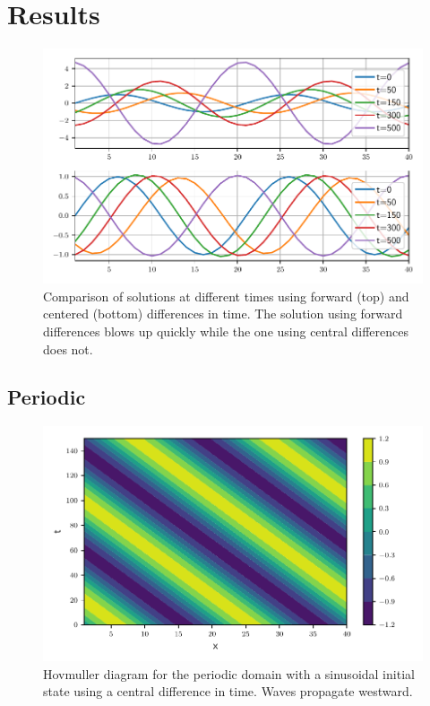 \section{Results}

\begin{figure}[htp]
  \centering
  \includegraphics[width=\textwidth]{../figures/compare_dt_1.pdf}
  \caption{Comparison of solutions at different times using forward (top) and
  centered (bottom) differences in time. The solution using forward differences
  blows up quickly while the one using central differences does not.}
  \label{fig:compare}
\end{figure}


\subsection{Periodic}



\begin{figure}[htp]
  \centering
  \includegraphics[width=\textwidth]{../figures/psi_periodic_centered_short.pdf}
  \caption{Hovmuller diagram for the periodic domain with a sinusoidal initial
  state using a central difference in time. Waves propagate westward.}
  \label{fig:periodic_sine}
\end{figure}



